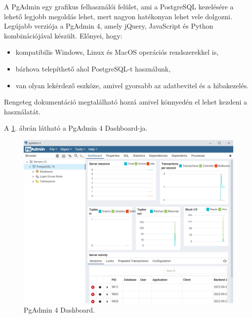 A PgAdmin \cite{PgAdmin} egy grafikus felhasználói felület, ami a PostgreSQL kezelésére a lehető legjobb megoldás lehet, mert nagyon hatékonyan lehet vele dolgozni. Legújabb verziója a PgAdmin 4, amely jQuery, JavaScript és Python kombinációjával készült. Előnyei, hogy:

\begin{itemize}
\item kompatibilis Windows, Linux és MacOS operációs rendszerekkel is,
\item bárhova telepíthető ahol PostgreSQL-t használunk,
\item van olyan lekérdező eszköze, amivel gyorsabb az adatbevitel és a hibakezelés.
\end{itemize}

Rengeteg dokumentáció megtalálható hozzá amivel könnyedén el lehet kezdeni a használatát.

A \ref{fig:PgAdmin 4}. ábrán látható a PgAdmin 4 Dashboard-ja.

\begin{figure}[h]
\centering
\includegraphics[scale=0.3]{images/PgAdmin.png}
\caption{PgAdmin 4 Dashboard.}
\label{fig:PgAdmin 4}
\end{figure}
\newpage

